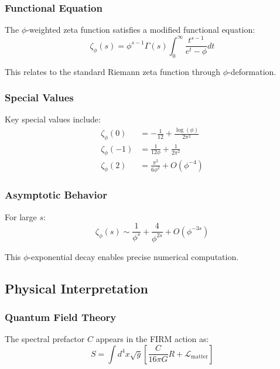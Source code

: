 \subsubsection{Functional Equation}

The $\phi$-weighted zeta function satisfies a modified functional equation:
\begin{equation}
\zeta_\phi(s) = \phi^{s-1} \Gamma(s) \int_0^\infty \frac{t^{s-1}}{e^t - \phi} dt
\end{equation}

This relates to the standard Riemann zeta function through $\phi$-deformation.

\subsubsection{Special Values}

Key special values include:
\begin{align}
\zeta_\phi(0) &= -\frac{1}{12} + \frac{\log(\phi)}{2\pi^2}\\
\zeta_\phi(-1) &= \frac{1}{12\phi} + \frac{1}{2\pi^2}\\
\zeta_\phi(2) &= \frac{\pi^2}{6\phi^2} + O(\phi^{-4})
\end{align}

\subsubsection{Asymptotic Behavior}

For large $s$:
\begin{equation}
\zeta_\phi(s) \sim \frac{1}{\phi^s} + \frac{4}{\phi^{2s}} + O(\phi^{-3s})
\end{equation}

This $\phi$-exponential decay enables precise numerical computation.

\subsection{Physical Interpretation}

\subsubsection{Quantum Field Theory}

The spectral prefactor $C$ appears in the FIRM action as:
\begin{equation}
S = \int d^4x \sqrt{g} \left[ \frac{C}{16\pi G} R + \mathcal{L}_{\text{matter}} \right]
\end{equation}

